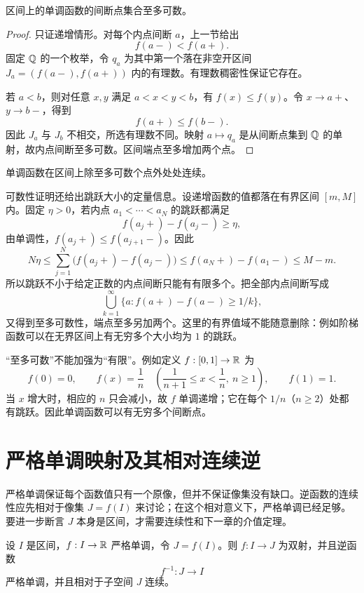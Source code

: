 \begin{theorem}
区间上的单调函数的间断点集合至多可数。
\end{theorem}

\begin{proof}
只证递增情形。对每个内点间断 \(a\)，上一节给出
\[
 f(a-)<f(a+).
\]
固定 \(\mathbb{Q}\) 的一个枚举，令 \(q_a\) 为其中第一个落在非空开区间 \(J_a=(f(a-),f(a+))\) 内的有理数。有理数稠密性保证它存在。

若 \(a<b\)，则对任意 \(x,y\) 满足 \(a<x<y<b\)，有 \(f(x)\le f(y)\)。令 \(x\to a+\)、\(y\to b-\)，得到
\[
 f(a+)\le f(b-).
\]
因此 \(J_a\) 与 \(J_b\) 不相交，所选有理数不同。映射 \(a\mapsto q_a\) 是从间断点集到 \(\mathbb{Q}\) 的单射，故内点间断至多可数。区间端点至多增加两个点。
\end{proof}

\begin{corollary}
单调函数在区间上除至多可数个点外处处连续。
\end{corollary}

可数性证明还给出跳跃大小的定量信息。设递增函数的值都落在有界区间 \([m,M]\) 内。固定 \(\eta>0\)，若内点
\(a_1<\cdots<a_N\) 的跳跃都满足
\[
 f(a_j+)-f(a_j-)\ge\eta,
\]
由单调性，\(f(a_j+)\le f(a_{j+1}-)\)。因此
\[
 N\eta
 \le\sum_{j=1}^{N}\bigl(f(a_j+)-f(a_j-)\bigr)
 \le f(a_N+)-f(a_1-)
 \le M-m.
\]
所以跳跃不小于给定正数的内点间断只能有有限多个。把全部内点间断写成
\[
 \bigcup_{k=1}^{\infty}
 \{a:f(a+)-f(a-)\ge 1/k\},
\]
又得到至多可数性，端点至多另加两个。这里的有界值域不能随意删除：例如阶梯函数可以在无界区间上有无穷多个大小均为 \(1\) 的跳跃。

“至多可数”不能加强为“有限”。例如定义 \(f:[0,1]\to\mathbb{R}\) 为
\[
 f(0)=0,
 \qquad
 f(x)=\frac1n\quad\left(\frac1{n+1}\le x<\frac1n,\ n\ge1\right),
 \qquad
 f(1)=1.
\]
当 \(x\) 增大时，相应的 \(n\) 只会减小，故 \(f\) 单调递增；它在每个 \(1/n\)（\(n\ge2\)）处都有跳跃。因此单调函数可以有无穷多个间断点。

\section{严格单调映射及其相对连续逆}

严格单调保证每个函数值只有一个原像，但并不保证像集没有缺口。逆函数的连续性应先相对于像集 \(J=f(I)\) 来讨论；在这个相对意义下，严格单调已经足够。要进一步断言 \(J\) 本身是区间，才需要连续性和下一章的介值定理。


\begin{theorem}[连续逆映射]
设 \(I\) 是区间，\(f:I\to\mathbb{R}\) 严格单调，令 \(J=f(I)\)。则 \(f:I\to J\) 为双射，并且逆函数
\[
 f^{-1}:J\to I
\]
严格单调，并且相对于子空间 \(J\) 连续。
\end{theorem}

